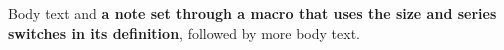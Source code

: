 \documentclass{article}
\newcommand{\note}[1]{{\small\bfseries #1}}
\begin{document}
Body text and \note{a note set through a macro that uses the size and series
switches in its definition}, followed by more body text.
\end{document}
